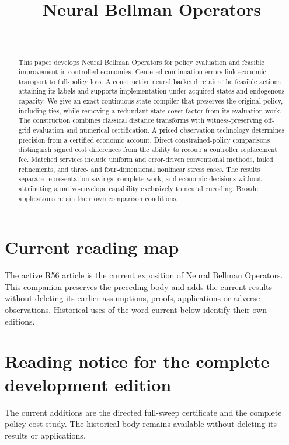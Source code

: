 \documentclass[ecta,nameyear,draft]{econsocart}
\begin{document}
\begin{frontmatter}
\title{Neural Bellman Operators}
\begin{aug}
\author[id=au1,addressref={add1}]{~}
\address[id=add1]{Peking University}
\end{aug}
\begin{abstract}
This paper develops Neural Bellman Operators for policy evaluation and feasible improvement in controlled economies. Centered continuation errors link economic transport to full-policy loss. A constructive neural backend retains the feasible actions attaining its labels and supports implementation under acquired states and endogenous capacity. We give an exact continuous-state compiler that preserves the original policy, including ties, while removing a redundant state-cover factor from its evaluation work. The construction combines classical distance transforms with witness-preserving off-grid evaluation and numerical certification. A priced observation technology determines precision from a certified economic account. Direct constrained-policy comparisons distinguish signed cost differences from the ability to recoup a controller replacement fee. Matched services include uniform and error-driven conventional methods, failed refinements, and three- and four-dimensional nonlinear stress cases. The results separate representation savings, complete work, and economic decisions without attributing a native-envelope capability exclusively to neural encoding. Broader applications retain their own comparison conditions.
\end{abstract}
\begin{keyword}
\end{keyword}
\end{frontmatter}
\section*{Current reading map}
The active R56 article is the current exposition of Neural Bellman Operators. This companion preserves the preceding body and adds the current results without deleting its earlier assumptions, proofs, applications or adverse observations. Historical uses of the word current below identify their own editions.

\section*{Reading notice for the complete development edition}
The current additions are the directed full-sweep certificate and the complete policy-cost study. The historical body remains available without deleting its results or applications.
\end{document}
